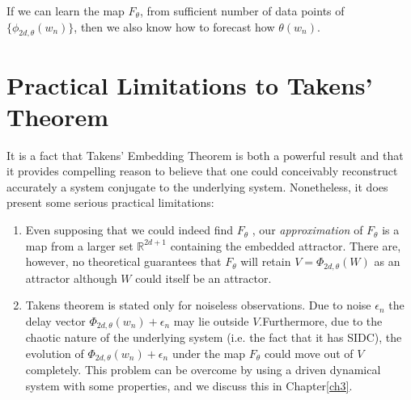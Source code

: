 \documentclass[a4paper,12pt,twoside]{report}
\newcommand{\Ftheta}{\ensuremath{F_\theta}}
\begin{document}
If we can learn the map $F_\theta$, from sufficient number of data points of $\{\phi_{2d,\theta}(w_n)\}$, then we also know how to forecast how $\theta(w_n)$. 




\section{Practical Limitations to Takens' Theorem}\label{sect_takenslimits}

It is a fact that Takens' Embedding Theorem is both a powerful result and that it provides compelling reason to believe that one could conceivably reconstruct accurately a system conjugate to the underlying system. Nonetheless, it does present some serious practical limitations:
\vspace{-5mm}
\begin{enumerate}
\item Even supposing that we could indeed find $F_\theta$ , our \emph{approximation} of  $F_\theta$ is a map from a larger set $\mathbb{R}^{2d+1}$ containing the embedded attractor. There are, however, no theoretical guarantees that $F_\theta$ will retain  $V=\Phi_{2d,\theta}(W)$  as an attractor although $W$ could itself be an attractor.
\item Takens theorem is stated only for noiseless observations. Due to noise $\epsilon_n$ the delay vector $\Phi_{2d,\theta}(w_n) + \epsilon_n$  may lie outside $V$.Furthermore, due to the chaotic nature of the underlying system (i.e. the fact that it has SIDC), the evolution of $\Phi_{2d,\theta}(w_n) + \epsilon_n$ under the map $F_\theta$ could move out of $V$ completely. This problem can be overcome  by using a driven dynamical system with some properties, and we discuss this in Chapter\ref{ch3}. 
\end{enumerate}
\end{document}
